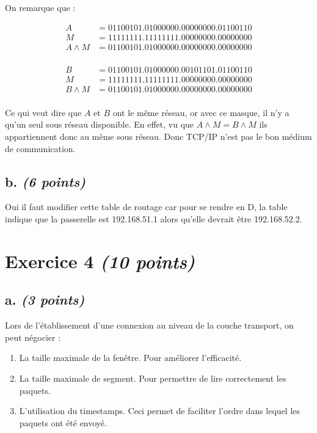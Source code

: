 \documentclass{article}
\begin{document}
On remarque que :


\noindent \begin{minipage}{9cm}
	\begin{align*}
		A &= 01100101.01000000.00000000.01100110\\
		M &= 11111111.11111111.00000000.00000000\\
		A \land  M &= 01100101.01000000.00000000.00000000\\
	\end{align*}
\end{minipage}
\begin{minipage}{7cm}
	\begin{align*}
		B &= 01100101.01000000.00101101.01100110\\
		M &= 11111111.11111111.00000000.00000000\\
		B \land  M &= 01100101.01000000.00000000.00000000\\
	\end{align*}
\end{minipage}

\hfill

Ce qui veut dire que $A$  et $B$ ont le même réseau, or avec ce masque, il n'y a qu'un seul sous réseau disponible. En effet, vu que $A \land  M = B \land  M$ ils appartiennent donc au même sous réseau. Donc TCP/IP n'est pas le bon médium de communication. 

\subsection{b. \emph{(6 points)}}

Oui il faut modifier cette table de routage car pour se rendre en D, la table indique que la passerelle est 192.168.51.1 alors qu'elle devrait être 192.168.52.2.

\clearpage

\section{Exercice 4 \emph{(10 points)}}

\subsection{a. \emph{(3 points)}}

Lors de l'établissement d'une connexion au niveau de la couche transport, on peut négocier :

\begin{enumerate}
	\item La taille maximale de la fenêtre. Pour améliorer l'efficacité.
	\item La taille maximale de segment. Pour permettre de lire correctement les paquets.
	\item L'utilisation du timestamps. Ceci permet de faciliter l'ordre dans lequel les paquets ont été envoyé. 
\end{enumerate}
\end{document}
